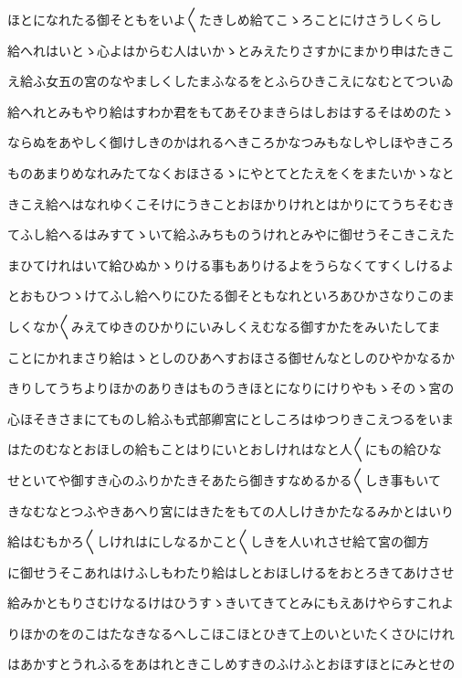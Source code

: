 \documentclass[a4paper,11pt,landscape]{ltjtarticle}
\begin{document}
ほとになれたる御そともをいよ〱たきしめ給てこゝろことにけさうしくらし
\par\medskip
給へれはいとゝ心よはからむ人はいかゝとみえたりさすかにまかり申はたきこ
\par\medskip
え給ふ女五の宮のなやましくしたまふなるをとふらひきこえになむとてついゐ
\par\medskip
給へれとみもやり給はすわか君をもてあそひまきらはしおはするそはめのたゝ
\par\medskip
ならぬをあやしく御けしきのかはれるへきころかなつみもなしやしほやきころ
\par\medskip
ものあまりめなれみたてなくおほさるゝにやとてとたえをくをまたいかゝなと
\par\medskip
きこえ給へはなれゆくこそけにうきことおほかりけれとはかりにてうちそむき
\par\medskip
てふし給へるはみすてゝいて給ふみちものうけれとみやに御せうそこきこえた
\par\medskip
まひてけれはいて給ひぬかゝりける事もありけるよをうらなくてすくしけるよ
\par\medskip
とおもひつゝけてふし給へりにひたる御そともなれといろあひかさなりこのま
\par\medskip
しくなか〱みえてゆきのひかりにいみしくえむなる御すかたをみいたしてま
\par\medskip
ことにかれまさり給はゝとしのひあへすおほさる御せんなとしのひやかなるか
\par\medskip
きりしてうちよりほかのありきはものうきほとになりにけりやもゝそのゝ宮の
\par\medskip
心ほそきさまにてものし給ふも式部卿宮にとしころはゆつりきこえつるをいま
\par\medskip
はたのむなとおほしの給もことはりにいとおしけれはなと人〱にもの給ひな
\par\medskip
せといてや御すき心のふりかたきそあたら御きすなめるかる〱しき事もいて
\par\medskip
きなむなとつふやきあへり宮にはきたをもての人しけきかたなるみかとはいり
\par\medskip
給はむもかろ〱しけれはにしなるかこと〱しきを人いれさせ給て宮の御方
\par\medskip
に御せうそこあれはけふしもわたり給はしとおほしけるをおとろきてあけさせ
\par\medskip
給みかともりさむけなるけはひうすゝきいてきてとみにもえあけやらすこれよ
\par\medskip
りほかのをのこはたなきなるへしこほこほとひきて上のいといたくさひにけれ
\par\medskip
はあかすとうれふるをあはれときこしめすきのふけふとおほすほとにみとせの
\end{document}
